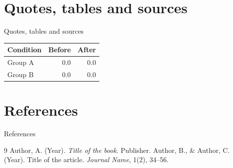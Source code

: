 \documentclass[aspectratio=169, 11pt, english]{beamer}
\begin{document}
\section{Quotes, tables and sources}

\begin{frame}{Quotes, tables and sources}

  \begin{center}
    \begin{tabular}{lrr}
      \toprule
      Condition & Before & After \\
      \midrule
      Group A & 0.0 & 0.0 \\
      Group B & 0.0 & 0.0 \\
      \bottomrule
    \end{tabular}
  \end{center}

\end{frame}

\section*{References}

\begin{frame}{References}
  \begin{thebibliography}{9}
      Author, A. (Year). \emph{Title of the book}. Publisher.
      Author, B., \& Author, C. (Year). Title of the article. \emph{Journal Name}, 1(2), 34--56.
  \end{thebibliography}
\end{frame}
\end{document}
